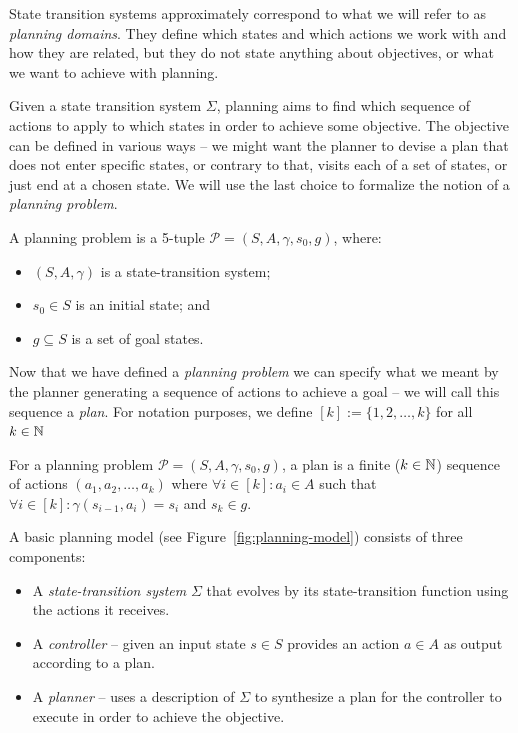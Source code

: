 State transition systems approximately correspond to what we will refer to as \textit{planning domains}.
They define which states and which actions we work with and how they
are related, but they do not state anything about objectives, or what
we want to achieve with planning.

Given a state transition system $\Sigma$, planning aims to find which
sequence of actions to apply to which states in order to achieve some objective.
The objective can be defined in various ways -- we might want the planner
to devise a plan that
does not enter specific states, or contrary to that, visits each of a set of states,
or just end at a chosen state.
We will use the last choice to formalize the notion of a \textit{planning problem}.

\begin{defn}\label{defn:planning-problem}\citep[Part~I]{Ghallab2004}
A planning problem is a 5-tuple $\mathcal{P} = (S, A, \gamma, s_0, g)$, where:
\begin{itemize}
\item $(S, A, \gamma)$ is a state-transition system;
\item $s_0 \in S$ is an initial state; and
\item $g \subseteq S$ is a set of goal states.
\end{itemize}
\end{defn}

Now that we have defined a \textit{planning problem} we can specify what we meant
by the planner generating a sequence of actions to achieve a goal -- we will
call this sequence a \textit{plan}.
For notation purposes, we define $[k] := \{1, 2, \ldots, k\}$ for all $k \in \mathbb{N}$

\begin{defn}[Plan]\label{defn:plan}\citep[Section~1.5]{Ghallab2004}
For a planning problem $\mathcal{P} = (S, A, \gamma, s_0, g)$,
a plan is a finite ($k \in \mathbb{N}$) sequence of actions $(a_1, a_2, \ldots, a_k)$ where
$\forall i \in [k] : a_i \in A$ such that
$\forall i \in [k] : \gamma(s_{i-1}, a_i) = s_i$ and $s_k \in g$.
\end{defn}

\noindent A basic planning model (see Figure~\ref{fig:planning-model}) consists of three components:

\begin{itemize}
\item A \textit{state-transition system} $\Sigma$ that evolves by its state-transition function using the actions
it receives.
\item A \textit{controller} -- given an input state $s \in S$ provides an action $a \in A$ as output according
to a plan.
\item A \textit{planner} -- uses a description of $\Sigma$ to synthesize a plan for the controller
to execute in order to achieve the objective.
\end{itemize}

